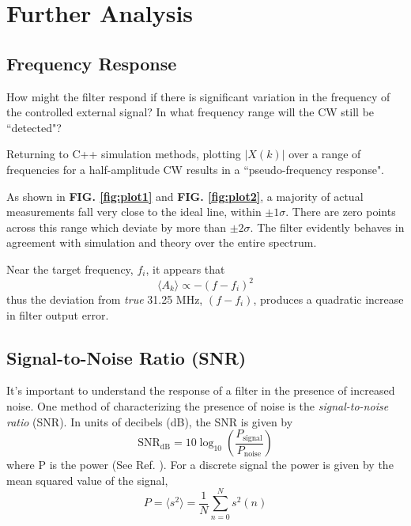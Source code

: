 \documentclass[reprint,amsmath,amssymb,aps,pra]{revtex4-2}
\begin{document}
\section{Further Analysis}

\subsection{Frequency Response}

How might the filter respond if there is significant variation in the frequency of the controlled external signal? In what frequency range will the CW still be ``detected"?

Returning to C++ simulation methods, plotting $|X(k)|$ over a range of frequencies for a half-amplitude CW results in a ``pseudo-frequency response".

As shown in \textbf{FIG. \ref{fig:plot1}} and \textbf{FIG. \ref{fig:plot2}}, a majority of actual measurements fall very close to the ideal line, within $\pm1\sigma$. There are zero points across this range which deviate by more than $\pm2\sigma$. The filter evidently behaves in agreement with simulation and theory over the entire spectrum. 

Near the target frequency, $f_i$, it appears that
\begin{equation}
    \langle A_k\rangle \propto -(f-f_i)^2
\end{equation}
thus the deviation from \textit{true} 31.25 MHz, $(f-f_i)$, produces a quadratic increase in filter output error.

\subsection{Signal-to-Noise Ratio (SNR)}
It's important to understand the response of a filter in the presence of increased noise. One method of characterizing the presence of noise is the \textit{signal-to-noise ratio} (SNR). In units of decibels (dB), the SNR is given by
\begin{equation}
\text{SNR}_{\text{dB}} = 10 \log_{10}\left( \frac{P_{\text{signal}}}{P_{\text{noise}}} \right)
\end{equation}
where P is the power (See Ref. \cite{Johnson:2006:SNR}). For a discrete signal the power is given by the mean squared value of the signal,
\begin{equation}
    P = \langle s^2 \rangle = \frac{1}{N} \sum_{n=0}^N s^2(n)
\end{equation}
\end{document}
